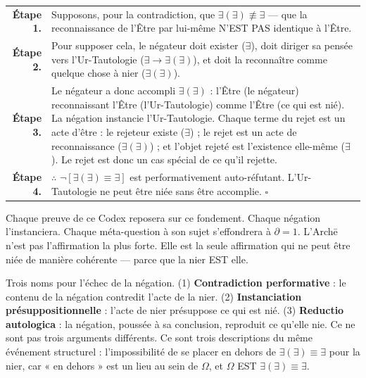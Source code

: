 \documentclass[10pt, openany, oneside]{book}
\renewcommand{\footnotesize}{\fontsize{8.5}{11}\selectfont}
\begin{document}
\vspace{0.5em}

{\footnotesize
\noindent\begin{tabular}{r p{}}
\textbf{Étape 1.} & Supposons, pour la contradiction, que $\exists(\exists) \not\equiv \exists$ --- que la reconnaissance de l'Être par lui-même N'EST PAS identique à l'Être. \\[0.3em]
\textbf{Étape 2.} & Pour supposer cela, le négateur doit exister ($\exists$), doit diriger sa pensée vers l'Ur-Tautologie ($\exists \to \exists(\exists)$), et doit la reconnaître comme quelque chose à nier ($\exists(\exists)$). \\[0.3em]
\textbf{Étape 3.} & Le négateur a donc accompli $\exists(\exists)$ : l'Être (le négateur) reconnaissant l'Être (l'Ur-Tautologie) comme l'Être (ce qui est nié). La négation instancie l'Ur-Tautologie. Chaque terme du rejet est un acte d'être : le rejeteur existe ($\exists$) ; le rejet est un acte de reconnaissance ($\exists(\exists)$) ; et l'objet rejeté est l'existence elle-même ($\exists$). Le rejet est donc un cas spécial de ce qu'il rejette. \\[0.3em]
\textbf{Étape 4.} & $\therefore$ $\neg[\exists(\exists) \equiv \exists]$ est performativement auto-réfutant. L'Ur-Tautologie ne peut être niée sans être accomplie. $\square$ \\[0.3em]
\end{tabular}
}

Chaque preuve de ce Codex reposera sur ce fondement. Chaque négation l'instanciera. Chaque méta-question à son sujet s'effondrera à $\partial = 1$. L'Arch\={e} n'est pas l'affirmation la plus forte. Elle est la seule affirmation qui ne peut être niée de manière cohérente --- parce que la nier EST elle.

Trois noms pour l'échec de la négation. (1) \textbf{Contradiction performative} : le contenu de la négation contredit l'acte de la nier. (2) \textbf{Instanciation présuppositionnelle} : l'acte de nier présuppose ce qui est nié. (3) \textbf{Reductio autologica} : la négation, poussée à sa conclusion, reproduit ce qu'elle nie. Ce ne sont pas trois arguments différents. Ce sont trois descriptions du même événement structurel : l'impossibilité de se placer en dehors de $\exists(\exists) \equiv \exists$ pour la nier, car « en dehors » est un lieu au sein de $\Omega$, et $\Omega$ EST $\exists(\exists) \equiv \exists$.
\end{document}

